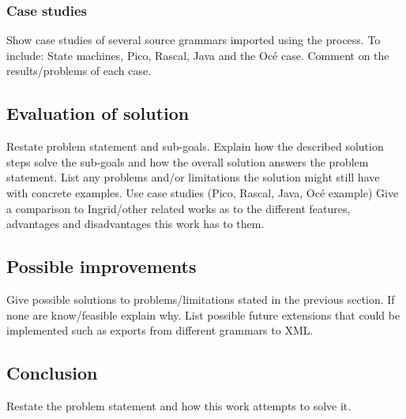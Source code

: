 \documentclass[a4paper, 11pt]{article}
\begin{document}
		\subsubsection*{Case studies}
		Show case studies of several source grammars imported using the process. To include: State machines, Pico, Rascal, Java and the Océ case. Comment on the results/problems of each case.
	\subsection*{Evaluation of solution}
		Restate problem statement and sub-goals. Explain how the described solution steps solve the sub-goals and how the overall solution answers the problem statement. List any problems and/or limitations the solution might still have with concrete examples. Use case studies (Pico, Rascal, Java, Océ example) Give a comparison to Ingrid/other related works as to the different features, advantages and disadvantages this work has to them. 
	\subsection*{Possible improvements}
		Give possible solutions to problems/limitations stated in the previous section. If none are know/feasible explain why. List possible future extensions that could be implemented such as exports from different grammars to XML.
	\subsection*{Conclusion}
		Restate the problem statement and how this work attempts to solve it.
\end{document}
